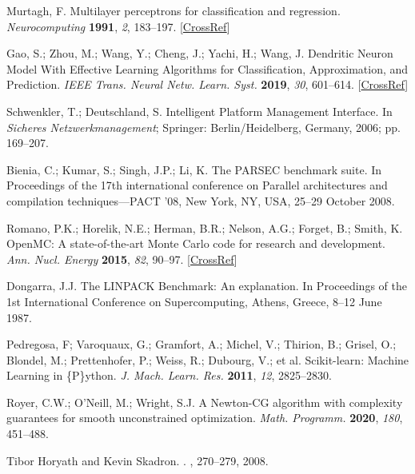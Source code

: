 \begin{thebibliography}{999}
	Murtagh, F. Multilayer perceptrons for classification and regression. {\em Neurocomputing} {\bf 1991}, {\em 2}, 183--197. [\href{http://dx.doi.org/10.1016/0925-2312(91)90023-5}{CrossRef}]
	
	Gao, S.; Zhou, M.; Wang, Y.; Cheng, J.; Yachi, H.; Wang, J. Dendritic Neuron Model With Effective Learning Algorithms for Classification, Approximation, and Prediction. {\em IEEE Trans. Neural Netw. Learn. Syst.} {\bf 2019}, {\em 30}, 601--614. [\href{http://dx.doi.org/10.1109/TNNLS.2018.2846646}{CrossRef}]
	
	Schwenkler, T.; Deutschland, S. Intelligent Platform Management Interface. In \emph{Sicheres Netzwerkmanagement}; Springer: Berlin/Heidelberg, Germany, 2006; pp. 169--207.
	
	Bienia, C.; Kumar, S.; Singh, J.P.; Li, K. The PARSEC benchmark suite. In Proceedings of the 17th international conference on Parallel architectures and compilation techniques---PACT '08, New York, NY, USA, 25--29 October 2008.
	
	Romano, P.K.; Horelik, N.E.; Herman, B.R.; Nelson, A.G.; Forget, B.; Smith, K. OpenMC: A state-of-the-art Monte Carlo code for research and development. {\em Ann. Nucl. Energy} {\bf 2015}, {\em 82}, 90--97. [\href{http://dx.doi.org/10.1016/j.anucene.2014.07.048}{CrossRef}]
	
	Dongarra, J.J. The LINPACK Benchmark: An explanation. In Proceedings of the 1st International Conference on Supercomputing, Athens, Greece, 8--12 June 1987.
	
	Pedregosa, F; Varoquaux, G.; Gramfort, A.; Michel, V.; Thirion, B.; Grisel, O.; Blondel, M.;  Prettenhofer, P.; Weiss, R.; Dubourg, V.; et al. Scikit-learn: Machine Learning in {\{}P{\}}ython. {\em J. Mach. Learn. Res.} {\bf 2011}, {\em 12}, 2825--2830.
	
	Royer, C.W.; O’Neill, M.; Wright, S.J. A Newton-CG algorithm with complexity guarantees for smooth
	unconstrained optimization. {\em Math. Programm.} {\bf 2020}, {\em 180}, 451--488.
	
	Tibor Horyath and Kevin Skadron.
	.
	, 270--279, 2008.


\end{thebibliography}
